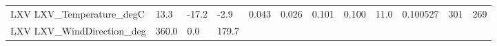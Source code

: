 \documentclass[11pt]{article}
\begin{document}
\begin{longtable}[]{@{}llllllllllll@{}}
\begin{minipage}[t]{0.18\columnwidth}
LXV LXV\_Temperature\_degC\strut
\end{minipage} & \begin{minipage}[t]{0.04\columnwidth}\raggedright\strut
13.3\strut
\end{minipage} & \begin{minipage}[t]{0.04\columnwidth}\raggedright\strut
-17.2\strut
\end{minipage} & \begin{minipage}[t]{0.04\columnwidth}\raggedright\strut
-2.9\strut
\end{minipage} & \begin{minipage}[t]{0.04\columnwidth}\raggedright\strut
0.043\strut
\end{minipage} & \begin{minipage}[t]{0.05\columnwidth}\raggedright\strut
0.026\strut
\end{minipage} & \begin{minipage}[t]{0.04\columnwidth}\raggedright\strut
0.101\strut
\end{minipage} & \begin{minipage}[t]{0.04\columnwidth}\raggedright\strut
0.100\strut
\end{minipage} & \begin{minipage}[t]{0.05\columnwidth}\raggedright\strut
11.0\strut
\end{minipage} & \begin{minipage}[t]{0.05\columnwidth}\raggedright\strut
0.100527\strut
\end{minipage} & \begin{minipage}[t]{0.05\columnwidth}\raggedright\strut
301\strut
\end{minipage} & \begin{minipage}[t]{0.07\columnwidth}\raggedright\strut
269\strut
\end{minipage}\tabularnewline
\begin{minipage}[t]{0.18\columnwidth}\raggedright\strut
LXV LXV\_WindDirection\_deg\strut
\end{minipage} & \begin{minipage}[t]{0.04\columnwidth}\raggedright\strut
360.0\strut
\end{minipage} & \begin{minipage}[t]{0.04\columnwidth}\raggedright\strut
0.0\strut
\end{minipage} & \begin{minipage}[t]{0.04\columnwidth}\raggedright\strut
179.7\strut
\end{minipage} & \begin{minipage}[t]{0.04\columnwidth}\raggedright\strut

\end{minipage}
\end{longtable}
\end{document}
